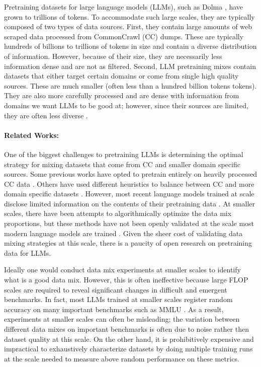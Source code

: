 \documentclass[10pt]{article} %
\begin{document}
Pretraining datasets for large language models (LLMs), such as Dolma \citep{soldaini2023dolma}, have grown to trillions of tokens.
To accommodate such large scales, they are typically composed of two types of data sources. 
First, they contain large amounts of web scraped data processed from CommonCrawl (CC) dumps. These are typically hundreds of billions to trillions of tokens in size and contain a diverse distribution of information. However, because of their size, they are necessarily less information dense and are not as filtered.
Second, LLM pretraining mixes contain datasets that either target certain domains or come from single high quality sources. 
These are much smaller (often less than a hundred billion tokens tokens).
They are also more carefully processed and are dense with information from domains we want LLMs to be good at; 
however, since their sources are limited, they are often less diverse \citep{together2023redpajama}.

\paragraph{Related Works:} One of the biggest challenges to pretraining LLMs is determining the optimal strategy for mixing datasets that come from CC and smaller domain specific sources.
Some previous works have opted to pretrain entirely on heavily processed CC data \citep{penedo2023refinedweb}.
Others have used different heuristics to balance between CC and more domain specific datasets \citep{together2023redpajama}.
However, most recent language models trained at scale disclose limited information on the contents of their pretraining data \citep{touvron2023llama, jiang2023mistral, jiang2024mixtral,team2024gemma}.
At smaller scales, there have been attempts to algorithmically optimize the data mix proportions, but these methods have not been openly validated at the scale most modern language models are trained \citep{xie2024doremi}.
Given the sheer cost of validating data mixing strategies at this scale, there is a paucity of open research on pretraining data for LLMs.


Ideally one would conduct data mix experiments at smaller scales to identify what is a good data mix.
However, this is often ineffective because large FLOP scales are required to reveal significant changes in difficult and emergent benchmarks.
In fact, most LLMs trained at smaller scales register random accuracy on many important benchmarks such as MMLU \citep{wei2022emergent}.
As a result, experiments at smaller scales can often be misleading; the variation between different data mixes on important benchmarks is often due to noise rather then dataset quality at this scale.
On the other hand, it is prohibitively expensive and impractical to exhaustively characterize datasets by doing multiple training runs at the scale needed to measure above random performance on these metrics.
\end{document}
